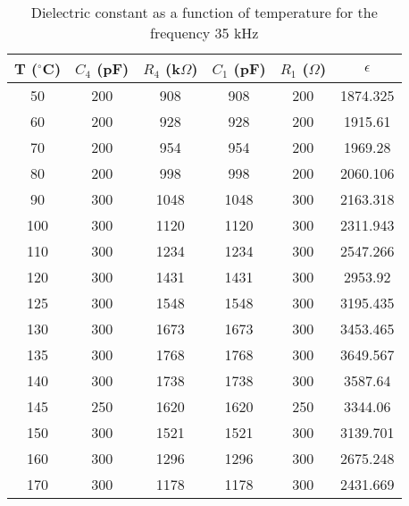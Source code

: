 \begin{table}[H]
    \centering
    \begin{tabular}{|c|c|c|c|c|c|}
    \hline
    T ($^\circ$C) & $C_4$ (pF) & $R_4$ (k$\Omega$) & $C_1$ (pF) & $R_1$ ($\Omega$) & $\epsilon$  \\ \hline
    50 & 200 & 908 & 908 & 200 & 1874.325 \\ \hline
    60 & 200 & 928 & 928 & 200 & 1915.61 \\ \hline
    70 & 200 & 954 & 954 & 200 & 1969.28 \\ \hline
    80 & 200 & 998 & 998 & 200 & 2060.106 \\ \hline
    90 & 300 & 1048 & 1048 & 300 & 2163.318 \\ \hline
    100 & 300 & 1120 & 1120 & 300 & 2311.943 \\ \hline
    110 & 300 & 1234 & 1234 & 300 & 2547.266 \\ \hline
    120 & 300 & 1431 & 1431 & 300 & 2953.92 \\ \hline
    125 & 300 & 1548 & 1548 & 300 & 3195.435 \\ \hline
    130 & 300 & 1673 & 1673 & 300 & 3453.465 \\ \hline
    135 & 300 & 1768 & 1768 & 300 & 3649.567 \\ \hline
    140 & 300 & 1738 & 1738 & 300 & 3587.64 \\ \hline
    145 & 250 & 1620 & 1620 & 250 & 3344.06 \\ \hline
    150 & 300 & 1521 & 1521 & 300 & 3139.701 \\ \hline
    160 & 300 & 1296 & 1296 & 300 & 2675.248 \\ \hline
    170 & 300 & 1178 & 1178 & 300 & 2431.669 \\ \hline
    \end{tabular}
    \caption{Dielectric constant as a function
    of temperature for the frequency 35 kHz}
    \label{tab:f3}
\end{table}
